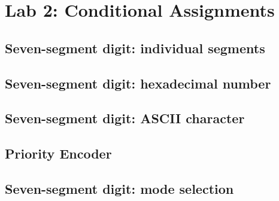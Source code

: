 \chapter{Lab 2: Conditional Assignments} \label{day2}

\section{Seven-segment digit: individual segments}



\section{Seven-segment digit: hexadecimal number}



\section{Seven-segment digit: ASCII character}





\section{Priority Encoder}



\section{Seven-segment digit: mode selection}


